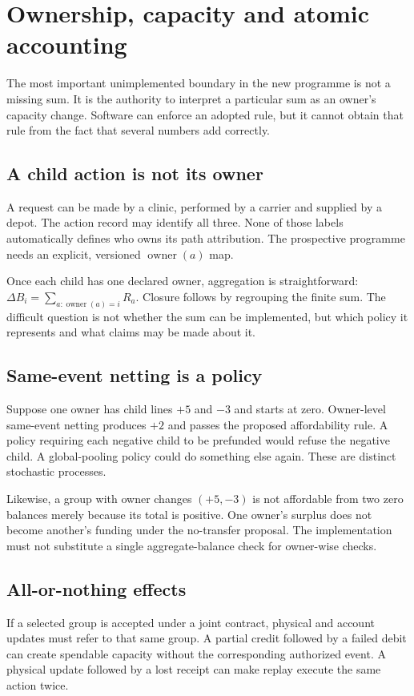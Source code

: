 \chapter{Ownership, capacity and atomic accounting}\label{ch:accounting}
The most important unimplemented boundary in the new programme is not a
missing sum. It is the authority to interpret a particular sum as an owner's
capacity change. Software can enforce an adopted rule, but it cannot obtain
that rule from the fact that several numbers add correctly.

\section{A child action is not its owner}
A request can be made by a clinic, performed by a carrier and supplied by
a depot. The action record may identify all three. None of those labels
automatically defines who owns its path attribution. The prospective
programme needs an explicit, versioned $\operatorname{owner}(a)$ map.

Once each child has one declared owner, aggregation is straightforward:
$\Delta B_i=\sum_{a:\operatorname{owner}(a)=i}R_a$. Closure follows
by regrouping the finite sum. The difficult question is not whether the
sum can be implemented, but which policy it represents and what claims
may be made about it.

\section{Same-event netting is a policy}
Suppose one owner has child lines $+5$ and $-3$ and starts at zero.
Owner-level same-event netting produces $+2$ and passes the proposed
affordability rule. A policy requiring each negative child to be prefunded
would refuse the negative child. A global-pooling policy could do something
else again. These are distinct stochastic processes.

Likewise, a group with owner changes $(+5,-3)$ is not affordable from
two zero balances merely because its total is positive. One owner's surplus
does not become another's funding under the no-transfer proposal. The
implementation must not substitute a single aggregate-balance check for
owner-wise checks.

\section{All-or-nothing effects}
If a selected group is accepted under a joint contract, physical and account
updates must refer to that same group. A partial credit followed by a failed
debit can create spendable capacity without the corresponding authorized
event. A physical update followed by a lost receipt can make replay execute
the same action twice.

